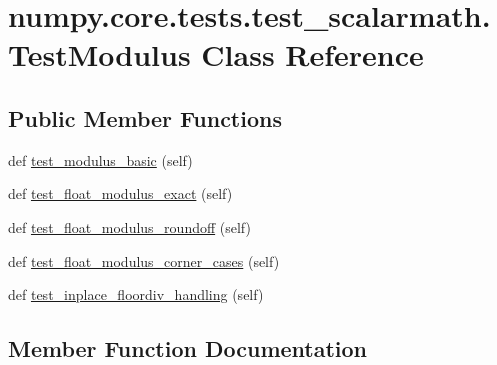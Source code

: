 \hypertarget{classnumpy_1_1core_1_1tests_1_1test__scalarmath_1_1TestModulus}{}\section{numpy.\+core.\+tests.\+test\+\_\+scalarmath.\+Test\+Modulus Class Reference}
\label{classnumpy_1_1core_1_1tests_1_1test__scalarmath_1_1TestModulus}
\subsection*{Public Member Functions}
\begin{DoxyCompactItemize}
\item 
def \hyperlink{classnumpy_1_1core_1_1tests_1_1test__scalarmath_1_1TestModulus_a7f51a84b7cf96e875faa88e9a2625d02}{test\+\_\+modulus\+\_\+basic} (self)
\item 
def \hyperlink{classnumpy_1_1core_1_1tests_1_1test__scalarmath_1_1TestModulus_a76bf516be235d77828101a58639b6975}{test\+\_\+float\+\_\+modulus\+\_\+exact} (self)
\item 
def \hyperlink{classnumpy_1_1core_1_1tests_1_1test__scalarmath_1_1TestModulus_a12d09744f5f47580c05d8a2efffcf04e}{test\+\_\+float\+\_\+modulus\+\_\+roundoff} (self)
\item 
def \hyperlink{classnumpy_1_1core_1_1tests_1_1test__scalarmath_1_1TestModulus_abc15c4d5e3017b784928b4a84dfeb366}{test\+\_\+float\+\_\+modulus\+\_\+corner\+\_\+cases} (self)
\item 
def \hyperlink{classnumpy_1_1core_1_1tests_1_1test__scalarmath_1_1TestModulus_aacf09b83207abc21338f834ab6564a09}{test\+\_\+inplace\+\_\+floordiv\+\_\+handling} (self)
\end{DoxyCompactItemize}


\subsection{Member Function Documentation}
\mbox{\label{classnumpy_1_1core_1_1tests_1_1test__scalarmath_1_1TestModulus_abc15c4d5e3017b784928b4a84dfeb366}} 
